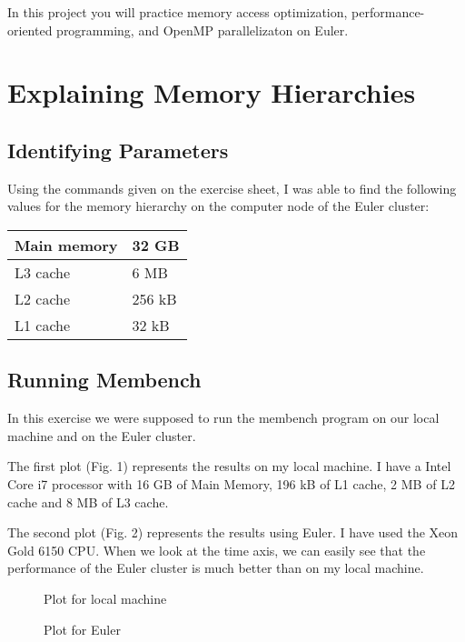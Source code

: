 \documentclass[unicode,11pt,a4paper,oneside,numbers=endperiod,openany]{scrartcl}
\begin{document}
\setassignment
{}

\newline

\assignmentpolicy
In this project you will practice memory access optimization, performance-oriented programming, and OpenMP parallelizaton 
on Euler.

\section{Explaining Memory Hierarchies }

\subsection{Identifying Parameters}
Using the commands given on the exercise sheet, I was able to find the following values for the memory hierarchy on the computer node of the Euler cluster:
\begin{center}
    \begin{tabular}{ |l|l| }
    \hline
    Main memory & 32 GB \\ \hline
    L3 cache & 6 MB \\ \hline
    L2 cache & 256 kB \\ \hline
    L1 cache & 32 kB \\
    \hline
    \end{tabular}
\end{center}

\subsection{Running Membench}
In this exercise we were supposed to run the membench program on our local machine and on the Euler cluster.

The first plot (Fig. 1) represents the results on my local machine. I have a Intel Core i7 processor with 16 GB of Main Memory, 196 kB of L1 cache, 2 MB of L2 cache and 8 MB of L3 cache.

The second plot (Fig. 2) represents the results using Euler. I have used the Xeon Gold 6150 CPU.
When we look at the time axis, we can easily see that the performance of the Euler cluster is much better than on my local machine.
\begin{figure}[h!]
    \centering
    \caption{Plot for local machine}
\end{figure}
\begin{figure}[h!]
    \centering
    \caption{Plot for Euler}
\end{figure}
\end{document}
